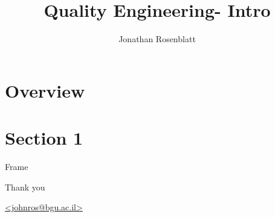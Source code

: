 \documentclass[12pt, mathserif,c]{beamer}
\author[J.R.]{Jonathan Rosenblatt}
\title[Quality Engineering]{Quality Engineering- Intro}
\institute[BGU]{Ben Gurion University of the Negev}
\date{}
\begin{document}
\begin{frame}
\titlepage
\end{frame}

\begin{frame}
\tableofcontents
\end{frame}





\section{Overview}
\frame{\insertsection}




\section{Section 1}
\begin{frame}
 Frame
\end{frame}


\begin{frame}

Thank you 

\url{<johnros@bgu.ac.il>}
\end{frame}










\end{document}
